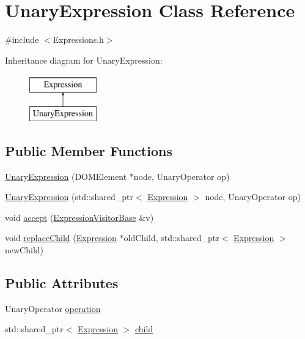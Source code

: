 \hypertarget{class_unary_expression}{\section{Unary\+Expression Class Reference}
\label{class_unary_expression}
}


{\ttfamily \#include $<$Expressions.\+h$>$}

Inheritance diagram for Unary\+Expression\+:\begin{figure}[H]
\begin{center}
\leavevmode
\includegraphics[height=2.000000cm]{class_unary_expression}
\end{center}
\end{figure}
\subsection*{Public Member Functions}
\begin{DoxyCompactItemize}
\item 
\hyperlink{class_unary_expression_aca5476e9c2604e9d4a9d3f7bf5d8e024}{Unary\+Expression} (D\+O\+M\+Element $\ast$node, Unary\+Operator op)
\item 
\hyperlink{class_unary_expression_a4a5ac8375de2f7bdf2e787bd4d19363c}{Unary\+Expression} (std\+::shared\+\_\+ptr$<$ \hyperlink{class_expression}{Expression} $>$ node, Unary\+Operator op)
\item 
void \hyperlink{class_unary_expression_a34d44f441b84b899b832cbd46b4b7821}{accept} (\hyperlink{class_expression_visitor_base}{Expression\+Visitor\+Base} \&v)
\item 
void \hyperlink{class_unary_expression_ae1a0cfc5fbae6d401c28e8a3158121a3}{replace\+Child} (\hyperlink{class_expression}{Expression} $\ast$old\+Child, std\+::shared\+\_\+ptr$<$ \hyperlink{class_expression}{Expression} $>$ new\+Child)
\end{DoxyCompactItemize}
\subsection*{Public Attributes}
\begin{DoxyCompactItemize}
\item 
Unary\+Operator \hyperlink{class_unary_expression_af585b4a298cc9b170e26bdc0809c5175}{operation}
\item 
std\+::shared\+\_\+ptr$<$ \hyperlink{class_expression}{Expression} $>$ \hyperlink{class_unary_expression_ae9f51f996e3ec7f389dfce2105128eaf}{child}
\end{DoxyCompactItemize}
